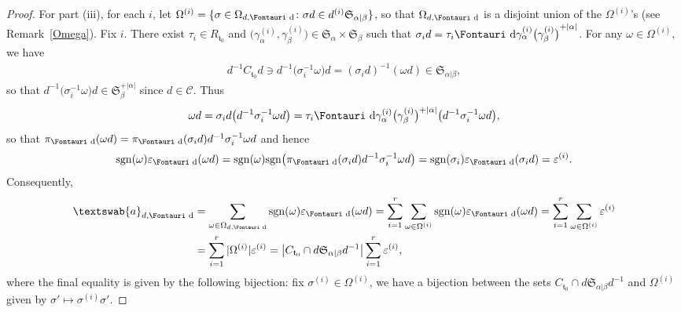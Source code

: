 \documentclass[pdftex]{sigma}
\renewcommand{\t}{\mathfrak{t}}
\renewcommand{\a}{\textswab{a}}
\newcommand{\sgn}{\mathrm{sgn}}
\newcommand{\sym}[1]{\mathfrak{S}_{#1}}
\newcommand{\C}{\mathscr{C}}
\newcommand{\dR}{\text{\Fontauri d}}
\newcommand{\e}{\varepsilon}
\newcommand{\tl}[2]{{#1}^{+#2}} %
\newcommand{\tlsym}[2]{\mathfrak{S}_{#1}^{+#2}}
\begin{document}
\begin{proof}
For part (iii), for each $i$, let $\Omega^{(i)} = \{ \sigma \in \Omega_{d,\dR} \colon \sigma d \in d^{(i)}\sym{\alpha|\beta} \}$, so that $\Omega_{d,\dR}$ is a disjoint union of the $\Omega^{(i)}$'s (see Remark~\ref{Omega}). Fix $i$. There exist $\tau_i \in R_{\t_0}$ and $\big(\gamma^{(i)}_{\alpha},\gamma_{\beta}^{(i)}\big)\in\sym{\alpha}\times \sym{\beta}$ such that $\sigma_i d = \tau_i\dR \gamma_{\alpha}^{(i)} \tl{\big(\gamma_{\beta}^{(i)}\big)}{|\alpha|}$. For any $\omega \in \Omega^{(i)}$, we have
\begin{gather*} d^{-1} C_{\t_0} d \ni d^{-1} \big(\sigma_i^{-1}\omega\big) d = (\sigma_i d)^{-1} (\omega d) \in \sym{\alpha|\beta},\end{gather*}
so that $d^{-1} \big(\sigma_i^{-1}\omega\big) d \in \tlsym{\beta}{|\alpha|}$ since $d \in \C$. Thus
\begin{gather*}
\omega d = \sigma_i d \big(d^{-1} \sigma_i ^{-1} \omega d\big) = \tau_i \dR \gamma^{(i)}_{\alpha} \big(\gamma^{(i)}_{\beta}\big)^{+|\alpha|}\big( d^{-1} \sigma_i^{-1} \omega d\big),\end{gather*}
so that $\pi_{\dR}(\omega d) = \pi_{\dR}(\sigma_i d) d^{-1} \sigma_i^{-1} \omega d$ and hence
\begin{gather*}
\sgn(\omega) \e_{\dR}(\omega d) = \sgn(\omega) \sgn\big(\pi_{\dR}(\sigma_i d) d^{-1} \sigma_i^{-1} \omega d\big) = \sgn(\sigma_i)\e_{\dR}(\sigma_i d) = \e^{(i)}.\end{gather*}
Consequently,
\begin{align*}\allowdisplaybreaks
\a_{d,\dR} &= \sum_{\omega \in \Omega_{d,\dR}} \sgn(\omega) \e_{\dR}(\omega d)
= \sum_{i=1}^r \sum_{\omega \in \Omega^{(i)}} \sgn(\omega) \e_{\dR}(\omega d)
= \sum_{i=1}^r \sum_{\omega \in \Omega^{(i)}} \e^{(i)} \\
&= \sum_{i=1}^r |\Omega^{(i)}| \e^{(i)}
= \big|C_{\t_0} \cap d \sym{\alpha|\beta}d^{-1}\big| \sum_{i=1}^r \e^{(i)},
\end{align*} where the final equality is given by the following bijection: fix $\sigma^{(i)}\in \Omega^{(i)}$, we have a bijection between the sets $C_{\t_0} \cap d \sym{\alpha|\beta}d^{-1}$ and $\Omega^{(i)}$ given by $\sigma'\mapsto \sigma^{(i)}\sigma'$.
\end{proof}
\end{document}
